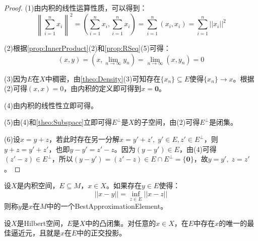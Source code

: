 \begin{proof}
	(1)由内积的线性运算性质，可以得到：
	\begin{equation*}
		\left\|\sum_{i=1}^nx_i\right\|^2
		=\left(\sum_{i=1}^nx_i,\sum_{i=1}^nx_i\right)
		=\sum_{i=1}^{n}(x_i,x_i)
		=\sum_{i=1}^{n}||x_i||^2
	\end{equation*}\par
	(2)根据\cref{prop:InnerProduct}(2)和\cref{prop:RSeq}(5)可得：
	\begin{equation*}
		(x,y)=\left(x,\lim_{n\to\infty}y_n\right)=\lim_{n\to\infty}(x,y_n)=0
	\end{equation*}\par
	(3)因为$E$在$X$中稠密，由\cref{theo:Density}(3)可知存在$\{x_n\}\subseteq E$使得$\{x_n\}\to x$。根据(2)可得$(x,x)=0$，由内积的定义即可得到$x=\mathbf{0}$。\par
	(4)由内积的线性性立即可得。\par
	(5)由(4)和\cref{theo:Subspace}立即可得$E^{\perp}$是$X$的子空间，由(2)可得$E^{\perp}$是闭集。\par
	(6)设$x=y+z$，若此时存在另一分解$x=y'+z',\;y'\in E,z'\in E^{\perp}$，则$y+z=y'+z'$，也即$y-y'=z'-z$。因为$(y-y')\in E$，由(4)可得$(z'-z)\in E^{\perp}$，所以$(y-y')=(z'-z)\in E\cap E^{\perp}=\{\mathbf{0}\}$，故$y=y',\;z=z'$。
\end{proof}
\begin{definition}
	设$X$是内积空间，$E\subseteq M$，$x\in X$。如果存在$y\in E$使得：
	\begin{equation*}
		||x-y||=\inf_{z\in E}||x-z||
	\end{equation*}
	则称$y$是$x$在$M$中的一个\gls{BestApproximationElement}。
\end{definition}
\begin{theorem}\label{theo:BestApproximationElement}
	设$X$是Hilbert空间，$E$是$X$中的凸闭集。对任意的$x\in X$，在$E$中存在$x$的唯一的最佳逼近元，且就是$x$在$E$中的正交投影。
\end{theorem}
